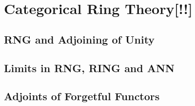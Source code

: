 \documentclass[12pt]{scrartcl}
\renewcommand{\.}{\; . \;}
\begin{document}
\section{Categorical Ring Theory[!!]}
\subsection{RNG and Adjoining of Unity}
\subsection{Limits in RNG, RING and ANN}
\subsection{Adjoints of Forgetful Functors}
\end{document}
